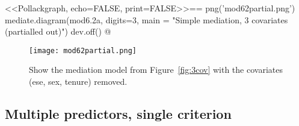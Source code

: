 \documentclass[11pt]{article}
\begin{document}
%
%
%
%
%
%
%
%
%
%
%

<<Pollackgraph,  echo=FALSE, print=FALSE>>==
png('mod62partial.png')
mediate.diagram(mod6.2a, digits=3, main = "Simple mediation, 3 covariates (partialled out)")
dev.off()
@

\begin{figure}[htbp]
\begin{center}
\texttt{[image: mod62partial.png]}
\caption{Show the mediation model from Figure~\ref{fig:3cov} with the covariates (ese, sex, tenure) removed.}
\label{fig:mod6.2a}
\end{center}
\end{figure}


\subsection{Multiple predictors, single criterion}
\end{document}

